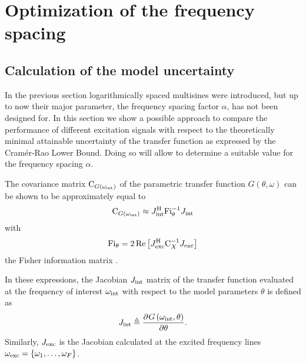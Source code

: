 \section{Optimization of the frequency spacing} \label{sec:optimAlpha}
  \subsection{Calculation of the model uncertainty}
  In the previous section logarithmically spaced multisines were introduced, but up to now their major parameter, the frequency spacing factor $\alpha$, has not been designed for.
  In this section we show a possible approach to compare the performance of different excitation signals with respect to the theoretically minimal attainable uncertainty of the transfer function as expressed by the Cramér-Rao Lower Bound.
  Doing so will allow to determine a suitable value for the frequency spacing $\alpha$.

  The covariance matrix $\mathrm{C}_{G\left(\omega_{\mathrm{int}}\right)}$ of the parametric transfer function $G(\theta,\omega)$ can be shown \citep{Pintelon2012, Gallager2008, matrixcookbook} to be approximately equal to
  \begin{align}
    \C_{G\left( \omega_{\interest}\right) } \approx
      \InnerQuadraticForm[\HT]
                         {\jac{\interest}}
                         {\FisherInformation_{\theta}^{-1}}
     \label{eq:varPeak}
  \end{align}
  with 
  \begin{equation}
    \FisherInformation_{\theta} =
    2
    \real{
          \InnerQuadraticForm[\HT]
                              {\jac{\excited}}
                              {\C_{X}^{-1}}
          }
    \label{eq:FisherInfo}
  \end{equation}
  the Fisher information matrix \citep{Pintelon2012}.

  In these expressions, the Jacobian $J_{\mathrm{int}}$ matrix of the transfer function evaluated at the frequency of interest $\omega_{\mathrm{int}}$ with respect to the model parameters $\theta$ is defined as
  \begin{equation}
    J_{\mathrm{int}} \triangleq
         \frac{{\partial}^{} G\left( \omega_{\mathrm{int}}, \theta \right) }{\partial \theta}
    \text{.}
  \end{equation}
  Similarly, $J_{\mathrm{exc}}$ is the Jacobian calculated at the excited frequency lines $\omega_{\mathrm{exc}} = \left\{\omega_1, \ldots, \omega_F\right\}$.

